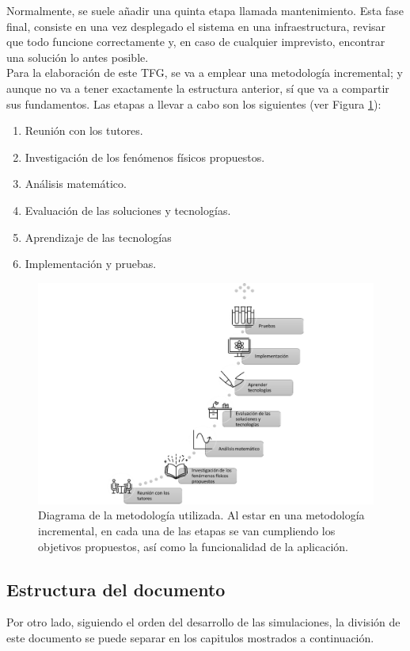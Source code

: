 \documentclass[../main.tex]{subfiles}
\begin{document}
Normalmente, se suele añadir una quinta etapa llamada mantenimiento. Esta fase final, consiste en una vez desplegado el sistema en una infraestructura, revisar que todo funcione correctamente y, en caso de cualquier imprevisto, encontrar una solución lo antes posible.\\

Para la elaboración de este TFG, se va a emplear una metodología incremental; y aunque no va a tener exactamente la estructura anterior, sí que va a compartir sus fundamentos. Las etapas a llevar a cabo son los siguientes (ver Figura \ref{fig:1.2}):

\begin{enumerate}
    \item Reunión con los tutores.
    \item Investigación de los fenómenos físicos propuestos.
    \item Análisis matemático.
    \item Evaluación de las soluciones y tecnologías.
    \item Aprendizaje de las tecnologías 
    \item Implementación y pruebas.
\end{enumerate}

\begin{figure}[!h]
    \centering
    \includegraphics{images/Figura1.2.png}
    \caption{Diagrama de la metodología utilizada. Al estar en una metodología incremental, en cada una de las etapas se van cumpliendo los objetivos propuestos, así como la funcionalidad de la aplicación.}
    \label{fig:1.2}
\end{figure}


\subsection{Estructura del documento}
Por otro lado, siguiendo el orden del desarrollo de las simulaciones, la división de este documento se puede separar en los capitulos mostrados a continuación.
\end{document}
